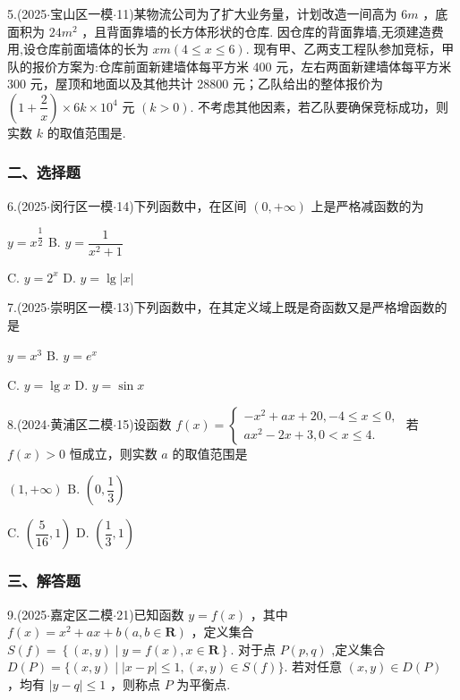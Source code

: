 5.(2025$\cdot$宝山区一模$\cdot$11)某物流公司为了扩大业务量，计划改造一间高为 $6{m}$ ，底面积为 ${24}{{m}}^{2}$ ，且背面靠墙的长方体形状的仓库. 因仓库的背面靠墙,无须建造费用,设仓库前面墙体的长为 $x{m}  \left( {4 \leq  x \leq  6}\right)$. 现有甲、乙两支工程队参加竞标，甲队的报价方案为:仓库前面新建墙体每平方米 400 元，左右两面新建墙体每平方米 300 元，屋顶和地面以及其他共计 28800 元；乙队给出的整体报价为 $\left( {1 + \dfrac{2}{x}}\right)  \times  {6k} \times  {10}^{4}$ 元 $\left( {k > 0}\right)$. 不考虑其他因素，若乙队要确保竞标成功，则实数 $k$ 的取值范围是\blkda[2]{}.

\subsubsection*{二、选择题}

6.(2025$\cdot$闵行区一模$\cdot$14)下列函数中，在区间 $\left( {0, + \infty }\right)$ 上是严格减函数的为 \dotfill{(\kh{})}

\xx{}{}{}{}$y = {x}^{\dfrac{1}{2}}$ B. $y = \dfrac{1}{{x}^{2} + 1}$

C. $y = {2}^{x}$ D. $y = \lg \left| x\right|$

7.(2025$\cdot$崇明区一模$\cdot$13)下列函数中，在其定义域上既是奇函数又是严格增函数的是 \dotfill{(\kh{})}

\xx{}{}{}{}$y = {x}^{3}$ B. $y = {{e}}^{x}$

C. $y = \lg x$ D. $y = \sin x$

8.(2024$\cdot$黄浦区二模$\cdot$15)设函数 $f\left( x\right)  = \left\{  \begin{array}{l}  - {x}^{2} + {ax} + {20}, - 4 \leq  x \leq  0, \\  a{x}^{2} - {2x} + 3,0 < x \leq  4. \end{array}\right.$ 若 $f\left( x\right)  > 0$ 恒成立，则实数 $a$ 的取值范围是 \dotfill{(\kh{})}

\xx{}{}{}{}$\left( {1, + \infty }\right)$ B. $\left( {0,\dfrac{1}{3}}\right)$

C. $\left( {\dfrac{5}{16},1}\right)$ D. $\left( {\dfrac{1}{3},1}\right)$

\subsubsection*{三、解答题}

9.(2025$\cdot$嘉定区二模$\cdot$21)已知函数 $y = f\left( x\right)$ ，其中 $f\left( x\right)  = {x}^{2} + {ax} + b\left( {a,b \in  \mathbf{R}}\right)$ ，定义集合 $S\left( f\right)  =  \left\{  {\left( {x,y}\right)  \mid  y = f\left( x\right) ,x \in  \mathbf{R}}\right\}$. 对于点 $P\left( {p,q}\right)$ ,定义集合 $D\left( P\right)  = \{ \left( {x,y}\right)  \mid  \left| {x - p}\right|  \leq  1,\left( {x,y}\right)  \in  S\left( f\right) \}$. 若对任意 $\left( {x,y}\right)  \in  D\left( P\right)$ ，均有 $\left| {y - q}\right|  \leq  1$ ，则称点 $P$ 为平衡点.

